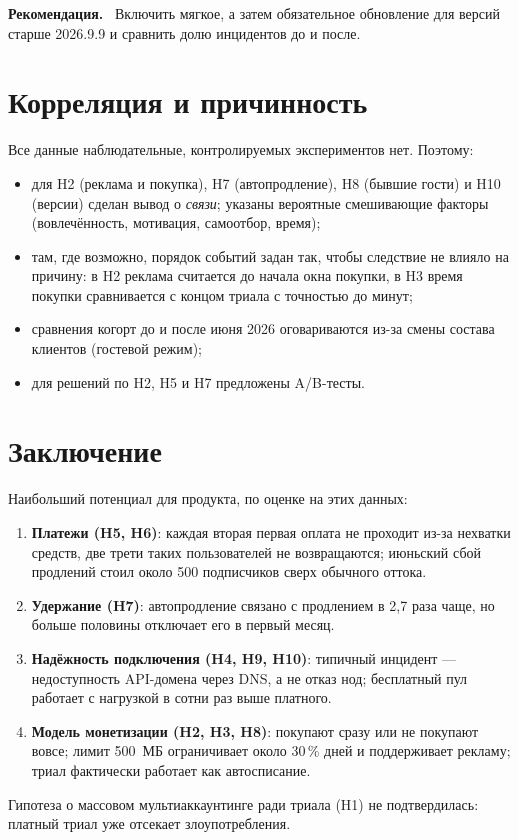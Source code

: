 \documentclass[11pt,a4paper]{article}
\newcommand{\hblock}[1]{\par\smallskip\noindent\textbf{#1.}~}
\begin{document}
\hblock{Рекомендация} Включить мягкое, а затем обязательное обновление для версий старше 2026.9.9 и сравнить долю инцидентов до и после.

\section{Корреляция и причинность}

Все данные наблюдательные, контролируемых экспериментов нет. Поэтому:
\begin{itemize}
  \item для H2 (реклама и покупка), H7 (автопродление), H8 (бывшие гости) и H10 (версии) сделан вывод о \emph{связи}; указаны вероятные смешивающие факторы (вовлечённость, мотивация, самоотбор, время);
  \item там, где возможно, порядок событий задан так, чтобы следствие не влияло на причину: в H2 реклама считается до начала окна покупки, в H3 время покупки сравнивается с концом триала с точностью до минут;
  \item сравнения когорт до и после июня 2026 оговариваются из-за смены состава клиентов (гостевой режим);
  \item для решений по H2, H5 и H7 предложены A/B-тесты.
\end{itemize}

\section{Заключение}

Наибольший потенциал для продукта, по оценке на этих данных:
\begin{enumerate}
  \item \textbf{Платежи (H5, H6)}: каждая вторая первая оплата не проходит из-за нехватки средств, две трети таких пользователей не возвращаются; июньский сбой продлений стоил около 500 подписчиков сверх обычного оттока.
  \item \textbf{Удержание (H7)}: автопродление связано с продлением в 2,7 раза чаще, но больше половины отключает его в первый месяц.
  \item \textbf{Надёжность подключения (H4, H9, H10)}: типичный инцидент --- недоступность API-домена через DNS, а не отказ нод; бесплатный пул работает с нагрузкой в сотни раз выше платного.
  \item \textbf{Модель монетизации (H2, H3, H8)}: покупают сразу или не покупают вовсе; лимит 500~МБ ограничивает около 30\,\% дней и поддерживает рекламу; триал фактически работает как автосписание.
\end{enumerate}
Гипотеза о массовом мультиаккаунтинге ради триала (H1) не подтвердилась: платный триал уже отсекает злоупотребления.
\end{document}
